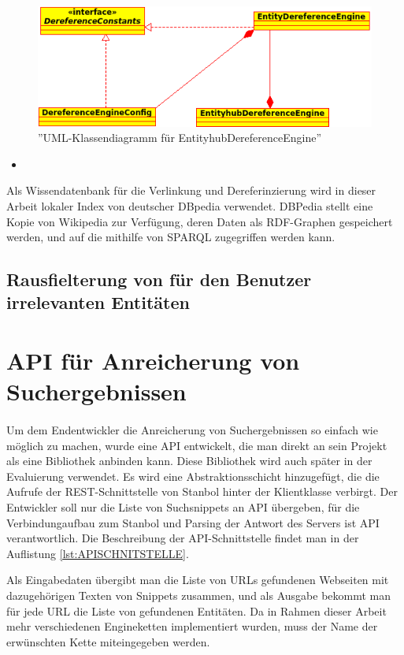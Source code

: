 \begin{figure}[ht]
\centering
\includegraphics[width=\textwidth]{Bilder/deref-uml.png}
\caption{''UML-Klassendiagramm für EntityhubDereferenceEngine''}
\label{fig:deref}
\end{figure}
\begin{itemize}
\item 
\end{itemize}

Als Wissendatenbank für die Verlinkung und Dereferinzierung wird in dieser Arbeit lokaler Index von deutscher DBpedia\cite{auer2007dbpedia} verwendet. DBPedia stellt eine Kopie von Wikipedia zur Verfügung, deren Daten als RDF-Graphen gespeichert werden, und auf die mithilfe von SPARQL zugegriffen werden kann.

\subsection{Rausfielterung von für den Benutzer irrelevanten Entitäten}

\section{API f{\"{u}}r Anreicherung von Suchergebnissen}
\paragraph{}
Um dem Endentwickler die Anreicherung von Suchergebnissen so einfach wie möglich zu machen, wurde eine API entwickelt, die man direkt an sein Projekt als eine Bibliothek anbinden kann. Diese Bibliothek wird auch später in der Evaluierung verwendet. Es wird eine Abstraktionsschicht hinzugefügt, die die Aufrufe der REST-Schnittstelle von Stanbol hinter der Klientklasse verbirgt. Der Entwickler soll nur die Liste von Suchsnippets an API übergeben, für die Verbindungaufbau zum Stanbol und Parsing der Antwort des Servers ist API verantwortlich. Die Beschreibung der API-Schnittstelle findet man in der Auflistung \ref{lst:APISCHNITSTELLE}. 

\lstset{language=Java}


Als Eingabedaten übergibt man die Liste von URLs gefundenen Webseiten mit dazugehörigen Texten von Snippets zusammen, und als Ausgabe bekommt man für jede URL die Liste von gefundenen Entitäten. Da in Rahmen dieser Arbeit mehr verschiedenen Engineketten implementiert wurden, muss der Name der erwünschten Kette miteingegeben werden.